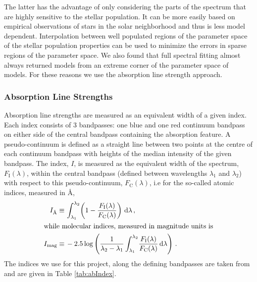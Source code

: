 	 	The latter has the advantage of only considering the parts of the spectrum that are highly sensitive to the stellar population. It can be more easily based on empirical observations of stars in the solar neighborhood and thus is less model dependent. Interpolation between well populated regions of the parameter space of the stellar population properties can be used to minimize the errors in sparse regions of the parameter space. We also found that full spectral fitting almost always returned models from an extreme corner of the parameter space of models. For these reasons we use the absorption line strength approach.

	 	\subsubsection{Absorption Line Strengths}
	 		\label{subsubsec:Absorption}
	 		Absorption line strengths are measured as an equivalent width of a given index. Each index consists of 3 bandpasses: one blue and one red continuum bandpass on either side of the central bandpass containing the absorption feature. A pseudo-continuum is defined as a straight line between two points at the centre of each continuum bandpass with heights of the median intensity of the given bandpass. The index, $I$, is measured as the equivalent width of the spectrum, $F_\mathrm{I}(\lambda)$, within the central bandpass (defined between wavelengths $\lambda_1$ and $\lambda_2$) with respect to this pseudo-continuum, $F_\mathrm{C}(\lambda)$, i.e for the so-called atomic indices, measured in \AA,
	 		\begin{align}
	 			I_\text{\AA} \equiv \, & \int^{\lambda_2}_{\lambda_1} \! \left(1 - \frac{F_\mathrm{I}(\lambda)}{F_\mathrm{C}(\lambda)}\right) \, \mathrm{d}\lambda \, , \\
	 		\intertext{while molecular indices, measured in magnitude units is}
	 			I_\text{mag} \equiv \, & -2.5 \log\left(\frac{1}{\lambda_2 - \lambda_1} \int^{\lambda_2}_{\lambda_1} \! \frac{F_\mathrm{I}(\lambda)}{F_\mathrm{C}(\lambda)} \, \mathrm{d}\lambda\right) \, .
	 		\end{align}
	 		The indices we use for this project, along the defining bandpasses are taken from \citet{Trager1998} and are given in Table \ref{tab:abIndex}.


